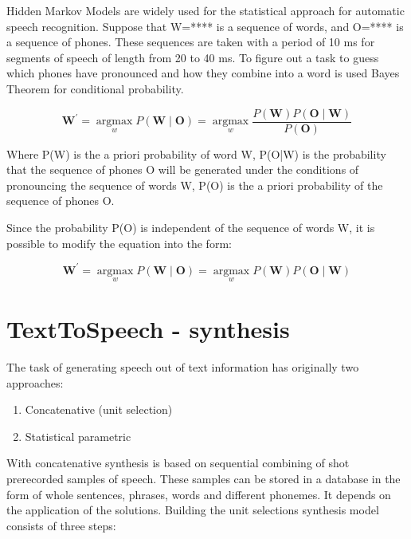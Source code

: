 Hidden Markov Models are widely used for the statistical approach for automatic speech recognition. Suppose that W=**** is a sequence of words, and O=**** is a sequence of phones. These sequences are taken with a period of 10 ms for segments of speech of length from 20 to 40 ms. To figure out a task to guess which phones have pronounced and how they combine into a word is used Bayes Theorem for conditional probability.

\begin{equation}
    \boldsymbol{W}^{\prime}=\underset{w}{\operatorname{argmax}} P(\boldsymbol{W} \mid \boldsymbol{O})=\underset{w}{\operatorname{argmax}} \frac{P(\boldsymbol{W}) P(\boldsymbol{O} \mid \boldsymbol{W})}{P(\boldsymbol{O})}
\end{equation}

Where P(W) is the a priori probability of word W, P(O|W) is the probability that the sequence of phones O will be generated under the conditions of pronouncing the sequence of words W, P(O) is the a priori probability of the sequence of phones O. 

Since the probability P(O) is independent of the sequence of words W, it is possible to modify the equation into the form:

\begin{equation}
    \boldsymbol{W}^{\prime}=\underset{w}{\operatorname{argmax}} P(\boldsymbol{W} \mid \boldsymbol{O})=\underset{w}{\operatorname{argmax}} P(\boldsymbol{W}) P(\boldsymbol{O} \mid \boldsymbol{W})
\end{equation}

\section{TextToSpeech - synthesis}

The task of generating speech out of text information has originally two approaches:
\begin{enumerate}
    \item Concatenative (unit selection)
    \item Statistical parametric
\end{enumerate}

With concatenative synthesis is based on sequential combining of shot prerecorded samples of speech. These samples can be stored in a database in the form of whole sentences, phrases, words and different phonemes. It depends on the application of the solutions. Building the unit selections synthesis model consists of three steps:

